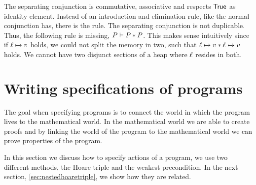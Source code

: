 \documentclass[thesis.tex]{subfiles}
\begin{document}
The separating conjunction is commutative, associative and respects $\textsf{\upshape True}$ as identity element. Instead of an introduction and elimination rule, like the normal conjunction has, there is the  rule. The separating conjunction is not duplicable. Thus, the following rule is missing, $P \vdash P * P$. This makes sense intuitively since if $\loc\fmapsto\val$ holds, we could not split the memory in two, such that $\loc\fmapsto\val * \loc\fmapsto\val$ holds. We cannot have two disjunct sections of a heap where $\ell$ resides in both.

\section{Writing specifications of programs}
\label{sec:Hoare}
The goal when specifying programs is to connect the world in which the program lives to the mathematical world. In the mathematical world we are able to create proofs and by linking the world of the program to the mathematical world we can prove properties of the program.

In this section we discuss how to specify actions of a program, we use two different methods, the Hoare triple and the weakest precondition. In the next section, \cref*{sec:nestedhoaretriple}, we show how they are related.
\end{document}
